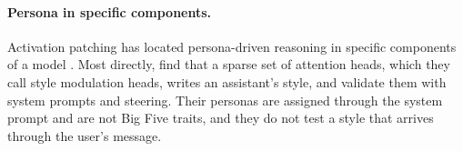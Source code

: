 \paragraph{Persona in specific components.}
Activation patching has located persona-driven reasoning in specific components of a model \citep{poonia2025dissecting}. Most directly, \citet{izawa2026steering} find that a sparse set of attention heads, which they call style modulation heads, writes an assistant's style, and validate them with system prompts and steering. Their personas are assigned through the system prompt and are not Big Five traits, and they do not test a style that arrives through the user's message.
